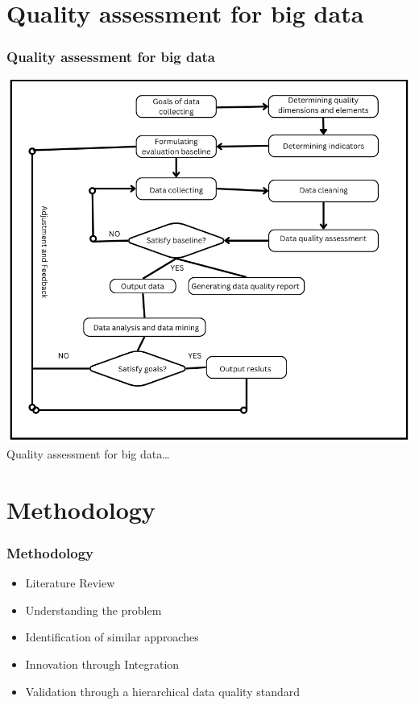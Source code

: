 \documentclass{beamer}
\begin{document}
\section{Quality assessment for big data}

\begin{frame}[fragile=singleslide]\frametitle{Quality assessment for big data}
\includegraphics[scale=.32]{Quality assesment process for Big Data.png}\\
{\tiny Quality assessment for big data\ldots}
\end{frame}


\section{Methodology}
\begin{frame}[fragile=singleslide]\frametitle{Methodology}
\begin{itemize}
\item Literature Review
\item Understanding the problem
\item Identification of similar approaches
\item Innovation through Integration
\item Validation through a hierarchical data quality standard
\end{itemize}
\end{frame}
\end{document}
